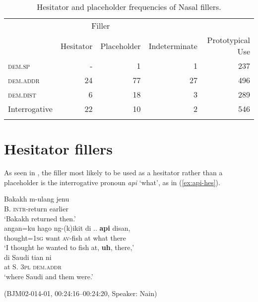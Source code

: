 \documentclass[output=paper,colorlinks,citecolor=brown
\ChapterDOI{10.5281/zenodo.15697585}
]{langscibook}
\begin{document}
\begin{table}
    \caption{Hesitator and placeholder frequencies of Nasal fillers.}
    \label{tab:billings:hes-vs-place}
    \begin{tabular}{l r r r r}
        \lsptoprule
        & \multicolumn{2}{c}{Filler}\\
        \cmidrule(lr){2-3}
        & {Hesitator} & {Placeholder} &{Indeterminate} & {Prototypical Use} \\
        \midrule
        \textsc{dem.sp}   & -  & 1  & 1 & 237 \\
        \textsc{dem.addr} & 24 & 77 & 27 & 496 \\
        \textsc{dem.dist} & 6  & 18 & 3 & 289 \\
        Interrogative     & 22 & 10 & 2 & 546 \\
        \lspbottomrule
    \end{tabular}
\end{table}

\section{Hesitator fillers}\label{sec:HesitatorFillers}

As seen in , the filler most likely to be used as a hesitator rather than a placeholder is the interrogative pronoun \textit{api} `what', as in (\ref{ex:api-hes}).

\begin{exe}
    \ex\label{ex:api-hes} \begin{xlist}[0\quad →A:]
         \gll
        Bakakh m-ulang jenu \\
        B. \textsc{intr}-return earlier\\
        \glt `Bakakh returned then.' \\
         \gll
        angan=ku hago ng-(k)ikit di .. \textbf{api} disan, \\
        thought=1\textsc{sg} want \textsc{av}-fish at {} what there \\
        \glt `I thought he wanted to fish at, \textbf{uh}, there,' \\
        \exi{3\quad \hphantom{→N:}} \gll
        di Saudi tian ni \\
        at S. 3\textsc{pl} \textsc{dem.addr} \\
        \glt `where Saudi and them were.' \\
    \end{xlist}
    \hfill (BJM02-014-01, 00:24:16–00:24:20, Speaker: Nain) 
\end{exe}
\end{document}
